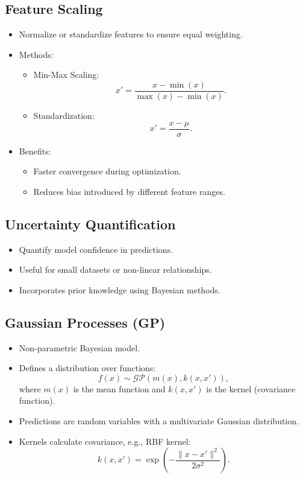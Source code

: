 \documentclass[12pt,a4paper]{article}
\begin{document}
\subsection{Feature Scaling}
\begin{itemize}
    \item Normalize or standardize features to ensure equal weighting.
    \item Methods:
    \begin{itemize}
        \item Min-Max Scaling:
        \[ x' = \frac{x - \min(x)}{\max(x) - \min(x)}. \]
        \item Standardization:
        \[ x' = \frac{x - \mu}{\sigma}. \]
    \end{itemize}
    \item Benefits:
    \begin{itemize}
        \item Faster convergence during optimization.
        \item Reduces bias introduced by different feature ranges.
    \end{itemize}
\end{itemize}

\subsection{Uncertainty Quantification}
\begin{itemize}
    \item Quantify model confidence in predictions.
    \item Useful for small datasets or non-linear relationships.
    \item Incorporates prior knowledge using Bayesian methods.
\end{itemize}
\subsection{Gaussian Processes (GP)}
\begin{itemize}
    \item Non-parametric Bayesian model.
    \item Defines a distribution over functions:
    \[ f(x) \sim \mathcal{GP}(m(x), k(x, x')), \]
    where $m(x)$ is the mean function and $k(x, x')$ is the kernel (covariance function).
    \item Predictions are random variables with a multivariate Gaussian distribution.
    \item Kernels calculate covariance, e.g., RBF kernel:
    \[ k(x, x') = \exp\left(-\frac{\|x - x'\|^2}{2\sigma^2}\right). \]
\end{itemize}
\end{document}
